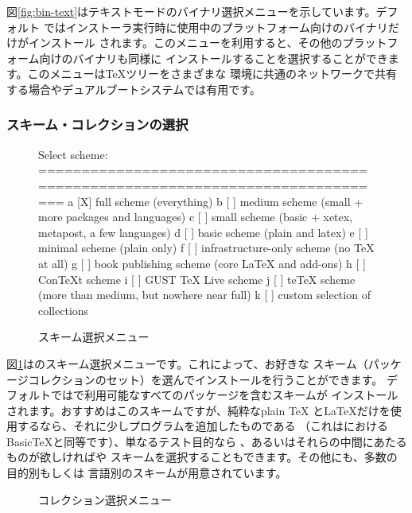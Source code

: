 \documentclass[uplatex,dvipdfmx,12pt]{jsarticle}
\begin{document}
図\ref{fig:bin-text}はテキストモードのバイナリ選択メニューを示しています。デフォルト
ではインストーラ実行時に使用中のプラットフォーム向けのバイナリだけがインストール
されます。このメニューを利用すると、その他のプラットフォーム向けのバイナリも同様に
インストールすることを選択することができます。このメニューは\TeX ツリーをさまざまな
環境に共通のネットワークで共有する場合やデュアルブートシステムでは有用です。

\subsubsection{スキーム・コレクションの選択}
\label{sec:components}

\begin{figure}[tbh]
\begin{boxedverbatim}
Select scheme:
===============================================================================
 a [X] full scheme (everything)
 b [ ] medium scheme (small + more packages and languages)
 c [ ] small scheme (basic + xetex, metapost, a few languages)
 d [ ] basic scheme (plain and latex)
 e [ ] minimal scheme (plain only)
 f [ ] infrastructure-only scheme (no TeX at all)
 g [ ] book publishing scheme (core LaTeX and add-ons)
 h [ ] ConTeXt scheme
 i [ ] GUST TeX Live scheme
 j [ ] teTeX scheme (more than medium, but nowhere near full)
 k [ ] custom selection of collections
\end{boxedverbatim}
\vspace{-1zh}
\caption{スキーム選択メニュー}\label{fig:scheme-text}
\end{figure}

図\ref{fig:scheme-text}は\TL のスキーム選択メニューです。これによって、お好きな
スキーム（パッケージコレクションのセット）を選んでインストールを行うことができます。
デフォルトでは\TL で利用可能なすべてのパッケージを含むスキームが
インストールされます。おすすめはこのスキームですが、純粋なplain \TeX
と\LaTeX だけを使用するなら、それに少しプログラムを追加したものである
（これは\MacTeX におけるBasic\TeX と同等です）、単なるテスト目的なら
、あるいはそれらの中間にあたるものが欲しければや
スキームを選択することもできます。その他にも、多数の目的別もしくは
言語別のスキームが用意されています。

\begin{figure}[tb]
\centering {}
\caption{コレクション選択メニュー}\label{fig:collections-gui}
\end{figure}
\end{document}
